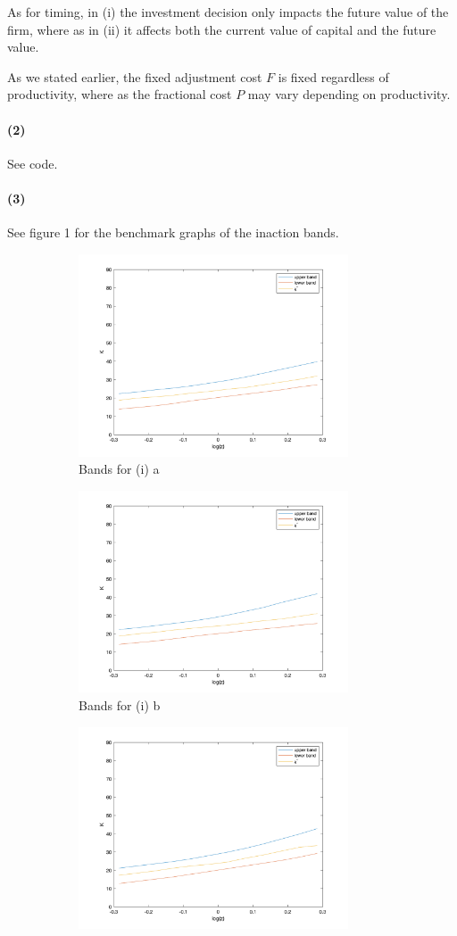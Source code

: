 \documentclass[10pt,letter]{article}
\newcommand{\problempart}[1]{\paragraph{#1}}
\begin{document}
As for timing, in (i) the investment decision only impacts the future value of the firm, where as in (ii) it affects both the current value of capital and the future value.

As we stated earlier, the fixed adjustment cost $F$ is fixed regardless of productivity, where as the fractional cost $P$ may vary depending on productivity.
\problempart{(2)}
See code.
\problempart{(3)} See figure 1 for the benchmark graphs of the inaction bands.
\begin{center}
\begin{figure}
\begin{subfigure}{.5\textwidth}
\includegraphics[width=8cm]{ps3q2_fig1}
\caption{Bands for (i) a}
\end{subfigure}
\begin{subfigure}{.5\textwidth}
\includegraphics[width=8cm]{ps3q2_fig2}
\caption{Bands for (i) b}
\end{subfigure}
\begin{subfigure}{.5\textwidth}
\includegraphics[width=8cm]{ps3q2_fig3}

\end{subfigure}
\end{figure}
\end{center}
\end{document}

